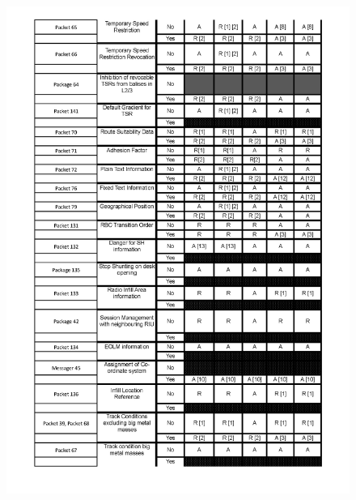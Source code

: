 \documentclass{template/openetcs_report}
\begin{document}
\begin{figure}[hbtp]
\centering
\includegraphics [scale=0.6]{images/LevelFilter2}
\end{figure}
\end{document}
